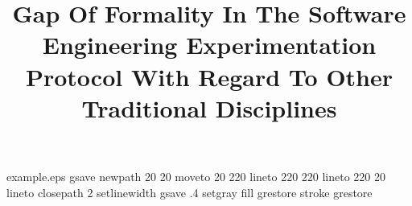%
%
%
%
%
\begin{filecontents*}{example.eps}
gsave
newpath
  20 20 moveto
  20 220 lineto
  220 220 lineto
  220 20 lineto
closepath
2 setlinewidth
gsave
  .4 setgray fill
grestore
stroke
grestore
\end{filecontents*}
%
\RequirePackage{fix-cm}
%
\documentclass[twocolumn]{svjour3}          %
%
\smartqed  %
%
\usepackage{graphicx}
%
%
%
\usepackage{graphicx}
\usepackage{tabulary}
\usepackage{multirow}
\usepackage{enumerate}
\usepackage{hyperref}
\usepackage{color}
\usepackage{soul}
\usepackage[latin1]{inputenc}
\usepackage{comment}
\usepackage{rotating}
\usepackage{framed}

\newcommand{\rodrinote}[1]{\textcolor{blue}{[RODRI:#1]}}

%
%


\title{Gap Of Formality In The Software Engineering Experimentation Protocol With Regard To Other Traditional Disciplines%
}

